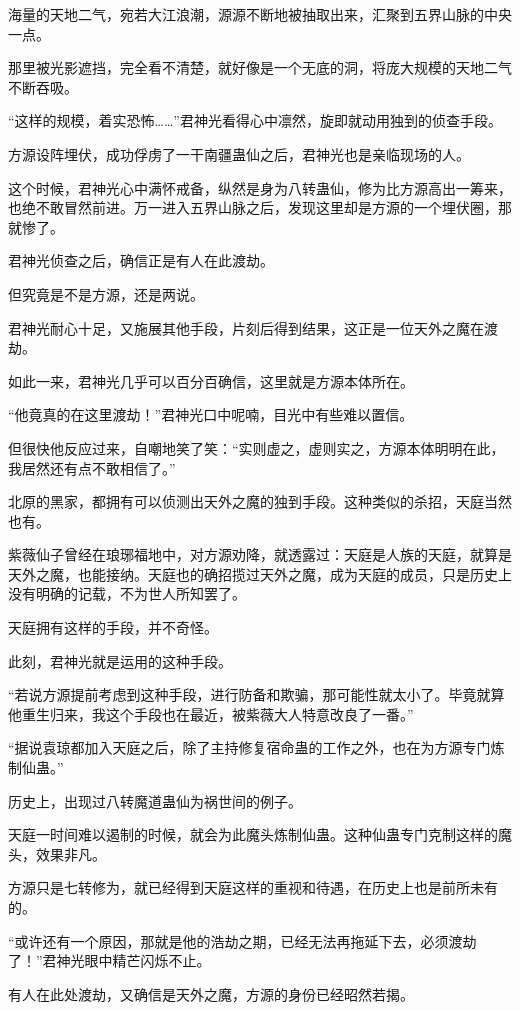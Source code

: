 \begin{this_body}
海量的天地二气，宛若大江浪潮，源源不断地被抽取出来，汇聚到五界山脉的中央一点。

那里被光影遮挡，完全看不清楚，就好像是一个无底的洞，将庞大规模的天地二气不断吞吸。

“这样的规模，着实恐怖……”君神光看得心中凛然，旋即就动用独到的侦查手段。

方源设阵埋伏，成功俘虏了一干南疆蛊仙之后，君神光也是亲临现场的人。

这个时候，君神光心中满怀戒备，纵然是身为八转蛊仙，修为比方源高出一筹来，也绝不敢冒然前进。万一进入五界山脉之后，发现这里却是方源的一个埋伏圈，那就惨了。

君神光侦查之后，确信正是有人在此渡劫。

但究竟是不是方源，还是两说。

君神光耐心十足，又施展其他手段，片刻后得到结果，这正是一位天外之魔在渡劫。

如此一来，君神光几乎可以百分百确信，这里就是方源本体所在。

“他竟真的在这里渡劫！”君神光口中呢喃，目光中有些难以置信。

但很快他反应过来，自嘲地笑了笑：“实则虚之，虚则实之，方源本体明明在此，我居然还有点不敢相信了。”

北原的黑家，都拥有可以侦测出天外之魔的独到手段。这种类似的杀招，天庭当然也有。

紫薇仙子曾经在琅琊福地中，对方源劝降，就透露过：天庭是人族的天庭，就算是天外之魔，也能接纳。天庭也的确招揽过天外之魔，成为天庭的成员，只是历史上没有明确的记载，不为世人所知罢了。

天庭拥有这样的手段，并不奇怪。

此刻，君神光就是运用的这种手段。

“若说方源提前考虑到这种手段，进行防备和欺骗，那可能性就太小了。毕竟就算他重生归来，我这个手段也在最近，被紫薇大人特意改良了一番。”

“据说袁琼都加入天庭之后，除了主持修复宿命蛊的工作之外，也在为方源专门炼制仙蛊。”

历史上，出现过八转魔道蛊仙为祸世间的例子。

天庭一时间难以遏制的时候，就会为此魔头炼制仙蛊。这种仙蛊专门克制这样的魔头，效果非凡。

方源只是七转修为，就已经得到天庭这样的重视和待遇，在历史上也是前所未有的。

“或许还有一个原因，那就是他的浩劫之期，已经无法再拖延下去，必须渡劫了！”君神光眼中精芒闪烁不止。

有人在此处渡劫，又确信是天外之魔，方源的身份已经昭然若揭。


\end{this_body}
